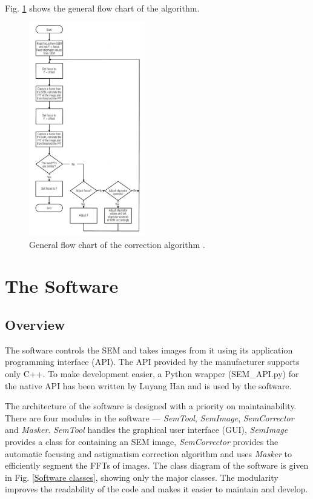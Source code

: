 \documentclass[conference]{IEEEtran}
\begin{document}
Fig. \ref{Correction algorithm flowchart} shows the general flow chart of the algorithm.

\begin{figure}[htbp]
    \centering
    \includegraphics[width=0.45\textwidth]{Images/Correction algorithm flowchart.jpg}
    \caption{General flow chart of the correction algorithm \cite{SEM astigmatation correction algorithm}.}
    \label{Correction algorithm flowchart}
\end{figure}

\section{The Software}
\subsection{Overview}
The software controls the SEM and takes images from it using its application programming interface (API). The API provided by the manufacturer supports only C++. To make development easier, a Python wrapper (SEM\_API.py) for the native API has been written by Luyang Han and is used by the software.

The architecture of the software is designed with a priority on maintainability. There are four modules in the software --- \textit{SemTool}, \textit{SemImage}, \textit{SemCorrector} and \textit{Masker}. \textit{SemTool} handles the graphical user interface (GUI), \textit{SemImage} provides a class for containing an SEM image, \textit{SemCorrector} provides the automatic focusing and astigmatism correction algorithm and uses \textit{Masker} to efficiently segment the FFTs of images. The class diagram of the software is given in Fig. \ref{Software classes}, showing only the major classes. The modularity improves the readability of the code and makes it easier to maintain and develop.
\end{document}
